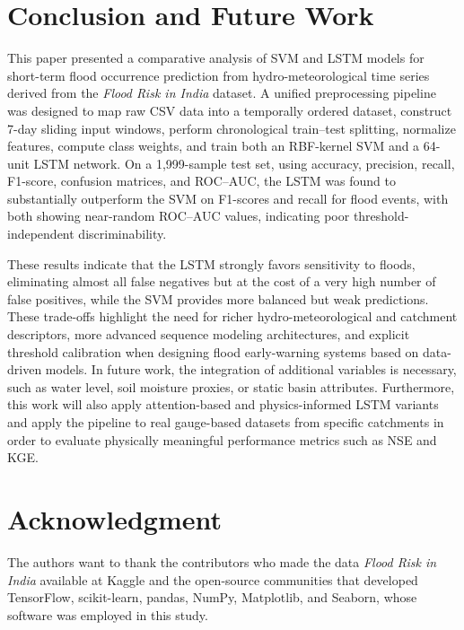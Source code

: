 \documentclass[conference]{IEEEtran}
\begin{document}
\section{Conclusion and Future Work}
This paper presented a comparative analysis of SVM and LSTM models for short-term flood occurrence prediction from hydro-meteorological time series derived from the \emph{Flood Risk in India} dataset. A unified preprocessing pipeline was designed to map raw CSV data into a temporally ordered dataset, construct 7-day sliding input windows, perform chronological train--test splitting, normalize features, compute class weights, and train both an RBF-kernel SVM and a 64-unit LSTM network. On a 1{,}999-sample test set, using accuracy, precision, recall, F1-score, confusion matrices, and ROC--AUC, the LSTM was found to substantially outperform the SVM on F1-scores and recall for flood events, with both showing near-random ROC--AUC values, indicating poor threshold-independent discriminability. 

These results indicate that the LSTM strongly favors sensitivity to floods, eliminating almost all false negatives but at the cost of a very high number of false positives, while the SVM provides more balanced but weak predictions. These trade-offs highlight the need for richer hydro-meteorological and catchment descriptors, more advanced sequence modeling architectures, and explicit threshold calibration when designing flood early-warning systems based on data-driven models. In future work, the integration of additional variables is necessary, such as water level, soil moisture proxies, or static basin attributes. Furthermore, this work will also apply attention-based and physics-informed LSTM variants and apply the pipeline to real gauge-based datasets from specific catchments in order to evaluate physically meaningful performance metrics such as NSE and KGE.

\section*{Acknowledgment} The authors want to thank the contributors who made the data \emph{Flood Risk in India} available at Kaggle and the open-source communities that developed TensorFlow, scikit-learn, pandas, NumPy, Matplotlib, and Seaborn, whose software was employed in this study.
\end{document}
